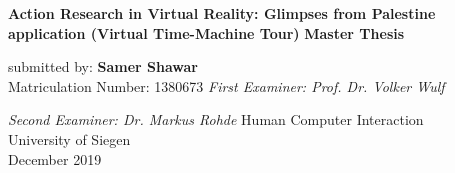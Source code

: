 \begin{titlepage}
    \begin{center}
        \vspace*{1cm}
        \Huge
        \textbf{Action Research in Virtual Reality: Glimpses from Palestine application (Virtual Time-Machine Tour)}
        \vfill
        \LARGE
        \textbf{Master Thesis}
        
        \vspace{0.5cm}
        submitted by:
        \vspace{1.5cm}
        \textbf{Samer Shawar}\\
        Matriculation Number: 1380673
        \vfill
        \textit {First Examiner: Prof. Dr. Volker Wulf}
        
        
        \textit {Second Examiner: Dr. Markus Rohde}
        \vfill
        \Large
        Human Computer Interaction\\
        University of Siegen\\
        December 2019\\
 \end{center}
\end{titlepage}